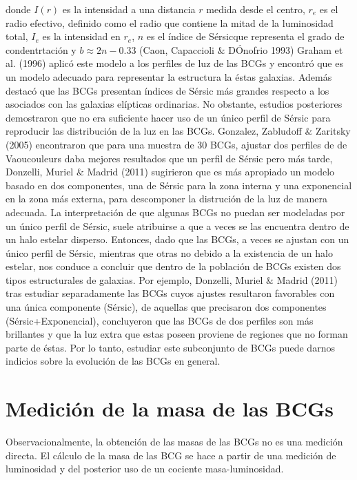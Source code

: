 donde $I(r)$ es la intensidad a una distancia $r$ medida desde el centro, $r_{e}$ es el radio efectivo, definido como
el radio que contiene la mitad de la luminosidad total, $I_{e}$ es la intensidad en $r_{e}$, $n$ es el \'indice de
S\'ersicque representa el grado de condentrtaci\'on y $b \approx 2n-0.33$ (Caon, Capaccioli $\&$ D\' Onofrio 1993) 
Graham et al. (1996) aplic\'o este modelo a los perfiles de luz de las BCGs y encontr\'o que es un modelo
adecuado para representar la estructura la \'estas galaxias. Adem\'as destac\'o que las BCGs presentan \'indices de
S\'ersic m\'as grandes respecto a los asociados con las galaxias el\'ipticas ordinarias. 
No obstante, estudios posteriores demostraron que no era suficiente hacer uso de un \'unico perfil
de S\'ersic para reproducir las distribuci\'on de la luz en las BCGs. Gonzalez, Zabludoff $\&$ Zaritsky (2005)
encontraron que para una muestra de 30 BCGs, ajustar dos perfiles de de Vaoucouleurs daba mejores resultados que
un perfil de S\'ersic pero m\'as tarde,  Donzelli, Muriel $\&$ Madrid (2011) sugirieron que es m\'as apropiado
un modelo basado en dos componentes, una de S\'ersic para la zona interna y una exponencial en la zona m\'as
externa, para descomponer la distruci\'on de la luz de manera adecuada. La interpretaci\'on
de que algunas BCGs no puedan ser modeladas por un \'unico perfil de S\'ersic, suele atribuirse
a que a veces se las encuentra dentro de un halo estelar disperso.
Entonces, dado que las BCGs, a veces se ajustan con un \'unico perfil de S\'ersic, mientras que otras no debido
a la existencia de un halo estelar,
nos conduce a concluir que dentro de la poblaci\'on de BCGs existen dos tipos estructurales de galaxias.
Por ejemplo, Donzelli, Muriel $\&$ Madrid (2011)
tras estudiar separadamente las BCGs cuyos ajustes resultaron favorables con una \'unica componente
(S\'ersic), de aquellas que precisaron dos componentes (S\'ersic+Exponencial), concluyeron
que las BCGs de dos perfiles son m\'as brillantes y que la luz extra que estas poseen 
proviene de regiones que no forman parte de \'estas.
Por lo tanto, estudiar este subconjunto de BCGs puede darnos indicios sobre la evoluci\'on de las BCGs en general.





\section{Medici\'on de la masa de las BCGs}\label{sec:masasbcg}

Observacionalmente, la obtenci\'on de las masas de las BCGs no es una medici\'on directa. El c\'alculo de la masa de las BCG se hace a
partir de una medici\'on de luminosidad y del posterior uso de un cociente masa-luminosidad.

